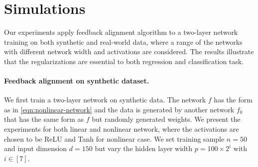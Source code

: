 \section{Simulations}

Our experiments apply feedback alignment algorithm to a two-layer network training on both synthetic and real-world data, where a range of the networks with different network width and activations are considered. The results illustrate that the regularizations are essential to both regression and classification task.

\paragraph{Feedback alignment on synthetic dataset.}

We first train a two-layer network on synthetic data. The network $f$ has the form as in \eqref{eqn:nonlinear-network} and the data is generated by another network $f_0$ that has the same form as $f$ but randomly generated weights. We present the experiments for both linear and nonlinear network, where the activations are chosen to be ReLU and Tanh for nonlinear case. We set training sample $n=50$ and input dimension $d=150$ but vary the hidden layer width $p = 100\times 2^i$ with $i\in[7]$. 


